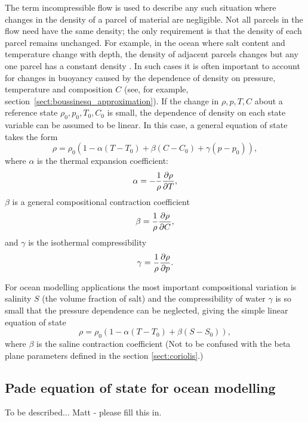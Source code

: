 The term incompressible flow is used to describe any such situation where
changes in the density of a parcel of material are negligible.  Not all
parcels in the flow need have the same density; the only requirement is that
the density of each parcel remains unchanged.  For example, in the ocean
where salt content and temperature change with depth, the density of
adjacent parcels changes but any one parcel has a constant density
\cite{panton2006}.  In such cases it is often important to account for
changes in buoyancy caused by the dependence of density on pressure,
temperature and composition $C$ (see, for example,
section~\ref{sect:boussinesq_approximation}).  If the change in $\rho,p,T,C$
about a reference state $\rho_0,p_0,T_0,C_0$ is small, the dependence of
density on each state variable can be assumed to be linear.  In this case, a
general equation of state takes the form
\begin{equation}
\rho = \rho_0(1 - \alpha(T-T_0) + \beta(C-C_0) + \gamma(p-p_0)),
\end{equation}
where $\alpha$ is the thermal expansion coefficient:
\begin{equation*}
\alpha = -\frac{1}{\rho}\frac{\partial\rho}{\partial T},
\end{equation*}
$\beta$ is a general compositional contraction coefficient
\begin{equation}
\beta = \frac{1}{\rho}\frac{\partial\rho}{\partial C},
\end{equation}
and $\gamma$ is the isothermal compressibility
\begin{equation}
\gamma = \frac{1}{\rho}\frac{\partial\rho}{\partial p}.
\end{equation}

For ocean modelling applications the most important compositional variation is salinity $S$ (the volume fraction of salt) and the compressibility of water $\gamma$ is so small that the pressure dependence can be neglected, giving the simple linear equation of state
\begin{equation}
\rho = \rho_0(1 - \alpha(T-T_0) + \beta(S-S_0)),
\end{equation}
where $\beta$ is the saline contraction coefficient (Not to be confused with the beta plane parameters defined in the section \ref{sect:coriolis}.)

\subsection{Pade equation of state for ocean modelling}\label{Sect:PadeDescription}
To be described... Matt - please fill this in.

